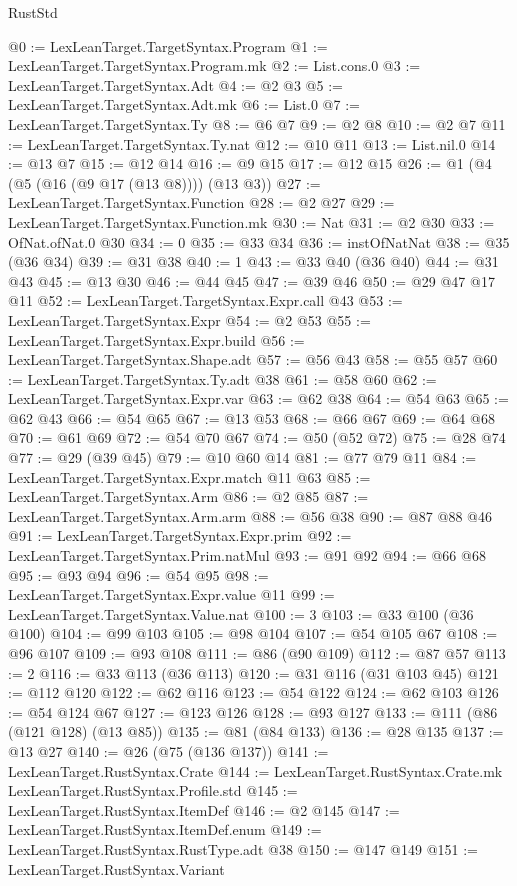 \begin{lexlean}{RustStd}
\begin{coremodule}
@0 := LexLeanTarget.TargetSyntax.Program
@1 := LexLeanTarget.TargetSyntax.Program.mk
@2 := List.cons.{0}
@3 := LexLeanTarget.TargetSyntax.Adt
@4 := @2 @3
@5 := LexLeanTarget.TargetSyntax.Adt.mk
@6 := List.{0}
@7 := LexLeanTarget.TargetSyntax.Ty
@8 := @6 @7
@9 := @2 @8
@10 := @2 @7
@11 := LexLeanTarget.TargetSyntax.Ty.nat
@12 := @10 @11
@13 := List.nil.{0}
@14 := @13 @7
@15 := @12 @14
@16 := @9 @15
@17 := @12 @15
@26 := @1 (@4 (@5 (@16 (@9 @17 (@13 @8)))) (@13 @3))
@27 := LexLeanTarget.TargetSyntax.Function
@28 := @2 @27
@29 := LexLeanTarget.TargetSyntax.Function.mk
@30 := Nat
@31 := @2 @30
@33 := OfNat.ofNat.{0} @30
@34 := 0
@35 := @33 @34
@36 := instOfNatNat
@38 := @35 (@36 @34)
@39 := @31 @38
@40 := 1
@43 := @33 @40 (@36 @40)
@44 := @31 @43
@45 := @13 @30
@46 := @44 @45
@47 := @39 @46
@50 := @29 @47 @17 @11
@52 := LexLeanTarget.TargetSyntax.Expr.call @43
@53 := LexLeanTarget.TargetSyntax.Expr
@54 := @2 @53
@55 := LexLeanTarget.TargetSyntax.Expr.build
@56 := LexLeanTarget.TargetSyntax.Shape.adt
@57 := @56 @43
@58 := @55 @57
@60 := LexLeanTarget.TargetSyntax.Ty.adt @38
@61 := @58 @60
@62 := LexLeanTarget.TargetSyntax.Expr.var
@63 := @62 @38
@64 := @54 @63
@65 := @62 @43
@66 := @54 @65
@67 := @13 @53
@68 := @66 @67
@69 := @64 @68
@70 := @61 @69
@72 := @54 @70 @67
@74 := @50 (@52 @72)
@75 := @28 @74
@77 := @29 (@39 @45)
@79 := @10 @60 @14
@81 := @77 @79 @11
@84 := LexLeanTarget.TargetSyntax.Expr.match @11 @63
@85 := LexLeanTarget.TargetSyntax.Arm
@86 := @2 @85
@87 := LexLeanTarget.TargetSyntax.Arm.arm
@88 := @56 @38
@90 := @87 @88 @46
@91 := LexLeanTarget.TargetSyntax.Expr.prim
@92 := LexLeanTarget.TargetSyntax.Prim.natMul
@93 := @91 @92
@94 := @66 @68
@95 := @93 @94
@96 := @54 @95
@98 := LexLeanTarget.TargetSyntax.Expr.value @11
@99 := LexLeanTarget.TargetSyntax.Value.nat
@100 := 3
@103 := @33 @100 (@36 @100)
@104 := @99 @103
@105 := @98 @104
@107 := @54 @105 @67
@108 := @96 @107
@109 := @93 @108
@111 := @86 (@90 @109)
@112 := @87 @57
@113 := 2
@116 := @33 @113 (@36 @113)
@120 := @31 @116 (@31 @103 @45)
@121 := @112 @120
@122 := @62 @116
@123 := @54 @122
@124 := @62 @103
@126 := @54 @124 @67
@127 := @123 @126
@128 := @93 @127
@133 := @111 (@86 (@121 @128) (@13 @85))
@135 := @81 (@84 @133)
@136 := @28 @135
@137 := @13 @27
@140 := @26 (@75 (@136 @137))
@141 := LexLeanTarget.RustSyntax.Crate
@144 := LexLeanTarget.RustSyntax.Crate.mk LexLeanTarget.RustSyntax.Profile.std
@145 := LexLeanTarget.RustSyntax.ItemDef
@146 := @2 @145
@147 := LexLeanTarget.RustSyntax.ItemDef.enum
@149 := LexLeanTarget.RustSyntax.RustType.adt @38
@150 := @147 @149
@151 := LexLeanTarget.RustSyntax.Variant

\end{coremodule}
\end{lexlean}
